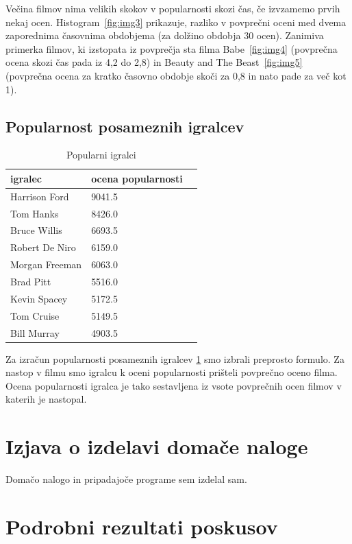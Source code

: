 \documentclass[a4paper,11pt]{article}
\begin{document}
Večina filmov nima velikih skokov v popularnosti skozi čas, če izvzamemo
prvih nekaj ocen. Histogram~\ref{fig:img3} prikazuje, razliko v povprečni
oceni med dvema zaporednima časovnima obdobjema (za dolžino obdobja 30 ocen).
Zanimiva primerka filmov, ki izstopata iz povprečja sta filma Babe~\ref{fig:img4} (povprečna
ocena skozi čas pada iz 4,2 do 2,8) in Beauty and The Beast~\ref{fig:img5} (povprečna
ocena za kratko časovno obdobje skoči za 0,8 in nato pade za več kot 1).


\subsection{Popularnost posameznih igralcev}


\begin{table}[htbp]
\caption{Popularni igralci}
\label{tab3}
\begin{center}
\begin{tabular}{llp{3cm}}
\hline
igralec & ocena popularnosti \\
\hline
Harrison Ford & 9041.5 \\
Tom Hanks & 8426.0 \\
Bruce Willis & 6693.5 \\
Robert De Niro & 6159.0 \\
Morgan Freeman & 6063.0 \\
Brad Pitt & 5516.0 \\
Kevin Spacey & 5172.5 \\
Tom Cruise & 5149.5 \\
Bill Murray & 4903.5 \\
\hline
\end{tabular}
\end{center}
\end{table}

Za izračun popularnosti posameznih igralcev \ref{tab3} smo izbrali preprosto
formulo. Za nastop v filmu smo igralcu k oceni popularnosti prišteli povprečno
oceno filma. Ocena popularnosti igralca je tako sestavljena iz vsote povprečnih
ocen filmov v katerih je nastopal.



\section{Izjava o izdelavi domače naloge}
Domačo nalogo in pripadajoče programe sem izdelal sam.

\appendix
\appendixpage
\section{\label{app-res}Podrobni rezultati poskusov}
\end{document}
